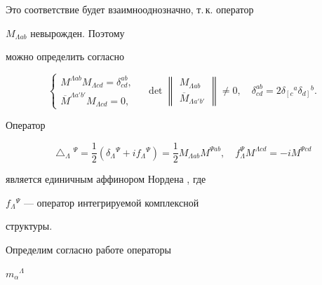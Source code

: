 Это соответствие будет взаимнооднозначно, т.\,к. оператор


$M_{\Lambda ab}$ невырожден. Поэтому


можно определить согласно \cite{1}


\begin{equation}


\label{e13a}


\begin{cases}


M^{\Lambda ab}M_{\Lambda cd} = \delta_{cd}^{ab},\\


\overline M^{\Lambda a'b'}M_{\Lambda cd} = 0,


\end{cases}


\quad


\det


\begin{Vmatrix}


M_{\Lambda ab} \\


\overline M_{\Lambda a'b'}


\end{Vmatrix}


\ne 0,\quad


\delta_{cd}^{ab}=2\delta_{\left[\right.c}{}^a\delta_{d\left.\right]}{}^b.


\end{equation}


Оператор


\begin{equation}


\label{e14a}


\bigtriangleup_\Lambda{}^\Psi=\frac{1}{2}


(\delta_\Lambda{}^\Psi+if_\Lambda{}^\Psi)=\frac{1}{2}


M_{\Lambda ab} M^{\Psi ab},\quad


f_\Lambda^\Psi M^{\Lambda cd}=-iM^{\Psi cd}


\end{equation}


является единичным аффинором Нордена \cite{6}, где


$f_\Lambda{}^\Psi$ --- оператор интегрируемой комплексной


структуры.


Определим согласно работе \cite{7} операторы


$m_\alpha{}^\Lambda$


